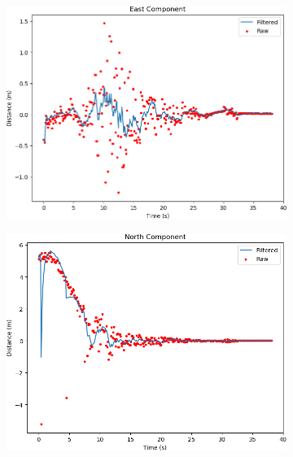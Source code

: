 \begin{figure}
    \center
    \begin{subfigure}[b]{0.49\textwidth}
         \centering
         \includegraphics[width=\textwidth]{images/landing_apriltag24h10_east}
    \end{subfigure}
    \hfill
    \begin{subfigure}[b]{0.49\textwidth}
         \centering
         \includegraphics[width=\textwidth]{images/landing_apriltag24h10_north}
    \end{subfigure}


\end{figure}
